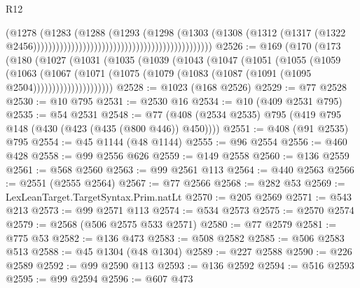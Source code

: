 \begin{lexlean}{R12}
\begin{coremodule}
{{{{{{{{{{{{{{{{{{{{{{{{{{{{{{{{{{{{{{{{{{{{{{{{{{{{{{{{{{{{{{{{{{{{{{{{{{{{{{{{{{{{{{{{{{{{{{{{{{{{{{{{{{                                                                              (@1278
                                                                                (@1283
                                                                                  (@1288
                                                                                    (@1293
                                                                                      (@1298
                                                                                        (@1303
                                                                                          (@1308
                                                                                            (@1312
                                                                                              (@1317
                                                                                                (@1322
                                                                                                  @2456)))))))))))))))))))))))))))))))))))))))))))))))
@2526 := @169
    (@170
      (@173
        (@180
          (@1027
            (@1031
              (@1035
                (@1039
                  (@1043
                    (@1047
                      (@1051
                        (@1055
                          (@1059
                            (@1063
                              (@1067
                                (@1071
                                  (@1075
                                    (@1079 (@1083 (@1087 (@1091 (@1095 @2504)))))))))))))))))))))
@2528 := @1023 (@168 @2526)
@2529 := @77 @2528
@2530 := @10 @795
@2531 := @2530 @16
@2534 := @10 (@409 @2531 @795)
@2535 := @54 @2531
@2548 := @77 (@408 (@2534 @2535) @795 (@419 @795 @148 (@430 (@423 (@435 (@800 @446)) @450))))
@2551 := @408 (@91 @2535) @795
@2554 := @45 @1144 (@48 @1144)
@2555 := @96 @2554
@2556 := @460 @428
@2558 := @99 @2556 @626
@2559 := @149 @2558
@2560 := @136 @2559
@2561 := @568 @2560
@2563 := @99 @2561 @113
@2564 := @440 @2563
@2566 := @2551 (@2555 @2564)
@2567 := @77 @2566
@2568 := @282 @53
@2569 := LexLeanTarget.TargetSyntax.Prim.natLt
@2570 := @205 @2569
@2571 := @543 @213
@2573 := @99 @2571 @113
@2574 := @534 @2573
@2575 := @2570 @2574
@2579 := @2568 (@506 @2575 @533 @2571)
@2580 := @77 @2579
@2581 := @775 @53
@2582 := @136 @473
@2583 := @508 @2582
@2585 := @506 @2583 @513
@2588 := @45 @1304 (@48 @1304)
@2589 := @227 @2588
@2590 := @226 @2589
@2592 := @99 @2590 @113
@2593 := @136 @2592
@2594 := @516 @2593
@2595 := @99 @2594
@2596 := @607 @473
}}}}}}}}}}}}}}}}}}}}}}}}}}}}}}}}}}}}}}}}}}}}}}}}}}}}}}}}}}}}}}}}}}}}}}}}}}}}}}}}}}}}}}}}}}}}}}}}}}}}}}}}}}
\end{coremodule}
\end{lexlean}
